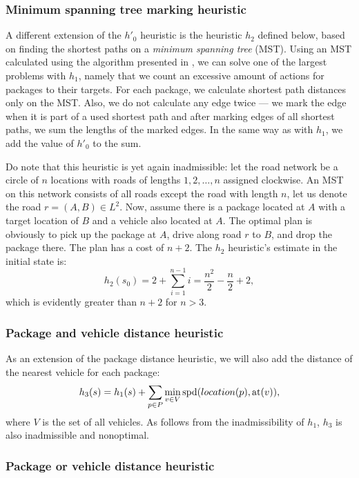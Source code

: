 \subsubsection{Minimum spanning tree marking heuristic}\label{sfa2}

A different extension of the $h'_0$ heuristic
is the heuristic $h_2$ defined below, based
on finding the shortest paths on a \textit{minimum spanning tree} (MST).
Using an MST calculated using the algorithm presented in \citet{Kruskal1956}, we can solve one of the largest problems with $h_1$,
namely that we count an excessive amount of \drive{} actions
for packages to their targets.
For each package, we calculate
shortest path distances only on the MST.
Also, we do not calculate any edge twice --- we mark
the edge when it is part of a used shortest path and
after marking edges of all shortest paths,
we sum the lengths of the marked edges.
In the same way as with $h_1$, we add the value of $h'_0$ to
the sum.

Do note that this heuristic is yet again inadmissible:
let the road network be a circle of $n$ locations with
roads of lengths $1, 2, \ldots, n$ assigned clockwise.
An MST on this network consists of all roads except the road
with length $n$, let us denote the road $r = (A, B) \in L^2$.
Now, assume there is a package located at $A$ with a target
location of $B$ and a vehicle also located at $A$.
The optimal plan is obviously to pick up the package at $A$,
drive along road $r$ to $B$, and drop the package there.
The plan has a cost of $n+2$. The $h_2$ heuristic's estimate
in the initial state is:
$$h_2(s_0) = 2 + \sum_{i=1}^{n-1} i = \frac{n^2}{2} - \frac{n}{2} + 2,$$
which is evidently greater than $n+2$ for $n > 3$.

\subsubsection{Package and vehicle distance heuristic}\label{sfa3}

As an extension of the package distance heuristic,
we will also add the distance of the nearest vehicle for
each package:
$$h_3(s) = h_1(s) + \sum_{p \in P} \min_{v \in V} \textrm{spd}(location(p), \textrm{at}(v)),$$
where $V$ is the set of all vehicles.
As follows from the inadmissibility of $h_1$, $h_3$
is also inadmissible and nonoptimal.

\subsubsection{Package or vehicle distance heuristic}\label{sfa4}

